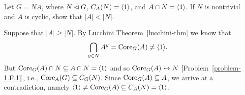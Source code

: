 \begin{probl}
    Let\/ $G=NA$, where\/ $N\lhd G$, $C_A(N)=\langle1\rangle$, and\/ $A\cap N=\langle1\rangle$. If\/ $N$ is nontrivial and\/ $A$ is cyclic, show that\/ $|A|<|N|$.
\end{probl}

\begin{solution} Suppose that $|A|\ge|N|$. By Lucchini Theorem~\ref{lucchini-thm} we know that
$$
    \bigcap_{y\in N}A^y={\rm Core}_G(A)\ne\langle1\rangle.
$$
But ${\rm Core}_G(A)\cap N\subseteq A\cap N=\langle1\rangle$ and so ${\rm Core}_G(A)\leftrightarrow N$ [Problem~\ref{problem-1.F.1}], i.e., ${\rm Core}_A(G)\subseteq C_G(N)$. Since ${\rm Core}_G(A)\subseteq A$, we arrive at a contradiction, namely $\langle1\rangle\ne{\rm Core}_G(A)\subseteq C_A(N)=\langle1\rangle$.  \end{solution}
